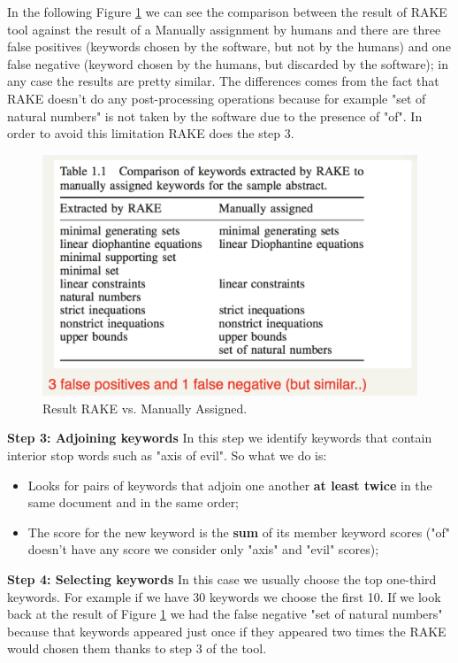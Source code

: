 In the following Figure \ref{fig:resultrake} we can see the comparison between the result of RAKE tool against the result of a Manually assignment by humans and there are three false positives (keywords chosen by the software, but not by the humans) and one false negative (keyword chosen by the humans, but discarded by the software); in any case the results are pretty similar. The differences comes from the fact that RAKE doesn't do any post-processing operations because for example "set of natural numbers" is not taken by the software due to the presence of "of". In order to avoid this limitation RAKE does the step 3.\newline
\begin{figure}
    \centering
    \includegraphics[width=\linewidth]{images/resultrake.png}
    \caption{Result RAKE vs. Manually Assigned.}
    \label{fig:resultrake}
\end{figure}
\textbf{Step 3: Adjoining keywords}\newline
In this step we identify keywords that contain interior stop words such as "axis of evil". So what we do is:
\begin{itemize}
    \item Looks for pairs of keywords that adjoin one another \textbf{at least twice} in the same document and in the same order;
    \item The score for the new keyword is the \textbf{sum} of its member keyword scores ("of" doesn't have any score we consider only "axis" and "evil" scores);
\end{itemize}
\textbf{Step 4: Selecting keywords}\newline
In this case we usually choose the top one-third keywords. For example if we have 30 keywords we choose the first 10.\newline
If we look back at the result of Figure \ref{fig:resultrake} we had the false negative "set of natural numbers" because that keywords appeared just once if they appeared two times the RAKE would chosen them thanks to step 3 of the tool.\newline
